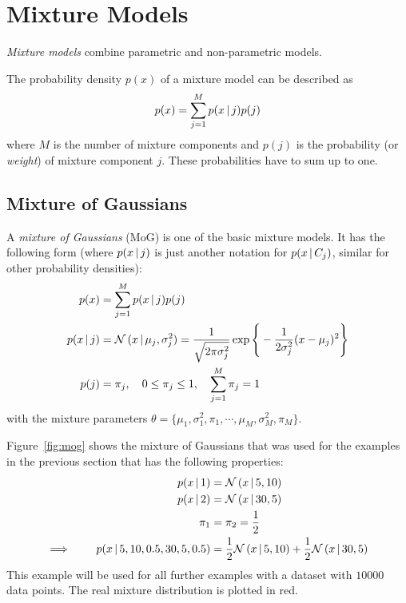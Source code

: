 	\section{Mixture Models}
		\emph{Mixture models} combine parametric and non-parametric models.

		The probability density \(p(x)\) of a mixture model can be described as
		\begin{equation}
			p(x) = \sum_{j = 1}^{M} p(x \,\vert\, j) p(j)
		\end{equation}
		where \(M\) is the number of mixture components and \(p(j)\) is the probability (or \emph{weight}) of mixture component \(j\). These probabilities have to sum up to one.

		\subsection{Mixture of Gaussians}
			A \emph{mixture of Gaussians} (MoG) is one of the basic mixture models. It has the following form (where \( p(x \,\vert\, j) \) is just another notation for \( p(x \,\vert\, C_j) \), similar for other probability densities):
			\begin{align}
				p(x) &= \sum_{j = 1}^{M} p(x \,\vert\, j) p(j) \\
				p(x \,\vert\, j) &= \mathcal{N}\,(x \,\vert\, \mu_j, \sigma_j^2) = \frac{1}{\sqrt{2\pi\sigma_j^2}} \exp\Bigg\{ -\frac{1}{2\sigma_j^2} (x - \mu_j)^2 \Bigg\} \\
				p(j) &= \pi_j, \quad 0 \leq \pi_j \leq 1, \quad \sum_{j = 1}^{M} \pi_j = 1
			\end{align}
			with the mixture parameters \( \theta = \{ \mu_1, \sigma_1^2, \pi_1, \cdots, \mu_M, \sigma_M^2, \pi_M \} \).

			Figure~\ref{fig:mog} shows the mixture of Gaussians that was used for the examples in the previous section that has the following properties:
			\begin{align}
				p(x \,\vert\, 1) &= \mathcal{N}\,(x \,\vert\, 5, 10) \\
				p(x \,\vert\, 2) &= \mathcal{N}\,(x \,\vert\, 30, 5) \\
				\pi_1 &= \pi_2 = \frac{1}{2} \\
				\implies\qquad p(x \,\vert\, 5, 10, 0.5, 30, 5, 0.5) &= \frac{1}{2} \mathcal{N}\,(x \,\vert\, 5, 10) + \frac{1}{2} \mathcal{N}\,(x \,\vert\, 30, 5)
			\end{align}
			This example will be used for all further examples with a dataset with \(10000\) data points. The real mixture distribution is plotted in red.

